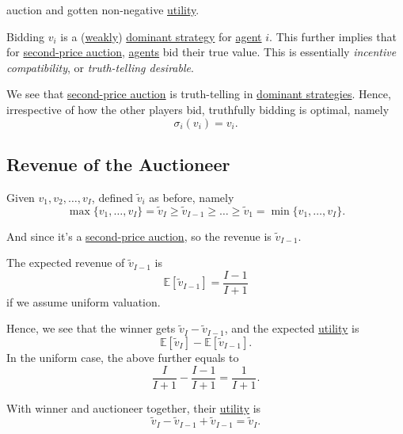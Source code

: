 \begin{itemize}
\begin{enumerate}
			      auction and gotten non-negative \hyperref[def:reward]{utility}.
	      \end{enumerate}
	      \begin{remark}\label{rmk:incentive-compatible}
		      Bidding \(v_i\) is a (\hyperref[def:weakly-dominant-strategy]{weakly}) \hyperref[def:dominant-strategy]{dominant strategy} for
		      \hyperref[def:player]{agent} \(i\). This further implies that for \hyperref[eg:second-price-auction]{second-price auction}, \hyperref[def:player]{agents} bid their true value.
		      This is essentially \emph{incentive compatibility}, or \emph{truth-telling desirable}.
	      \end{remark}
\end{itemize}

\begin{remark}
	We see that \hyperref[eg:second-price-auction]{second-price auction} is truth-telling in \hyperref[def:dominant-strategy]{dominant strategies}.
	Hence, irrespective of how the other players bid, truthfully bidding is optimal, namely
	\[
		\sigma_{i}(v_{i}) = v_{i}.
	\]
\end{remark}

\subsection{Revenue of the Auctioneer}
Given \(v_1, v_2, \ldots , v_I\), defined \(\widetilde{v}_i\) as before, namely
\[
	\max\{v_1, \ldots , v_I\} = \widetilde{v}_{I}\geq \widetilde{v}_{I-1}\geq \ldots \geq \widetilde{v}_1 = \min\{v_1, \ldots , v_I\}.
\]

And since it's a \hyperref[eg:second-price-auction]{second-price auction}, so the revenue is \(\widetilde{v}_{I - 1}\).

\begin{note}
	The expected revenue of \(\widetilde{v}_{I - 1}\) is
	\[
		\mathbb{E}\left[\widetilde{v}_{I-1} \right] = \frac{I-1}{I+1}
	\]
	if we assume uniform valuation.
\end{note}

Hence, we see that the winner gets \(\widetilde{v}_{I} - \widetilde{v}_{I-1}\), and the expected \hyperref[def:reward]{utility}  is
\[
	\mathbb{E}\left[\widetilde{v}_{I} \right] - \mathbb{E}\left[\widetilde{v}_{I - 1} \right].
\]
In the uniform case, the above further equals to
\[
	\frac{I}{I+1} - \frac{I - 1}{I + 1} = \frac{1}{I+1}.
\]

With winner and auctioneer together, their \hyperref[def:reward]{utility}  is
\[
	\widetilde{v}_{I} - \widetilde{v}_{I - 1}+\widetilde{v}_{I - 1} = \widetilde{v}_{I}.
\]

